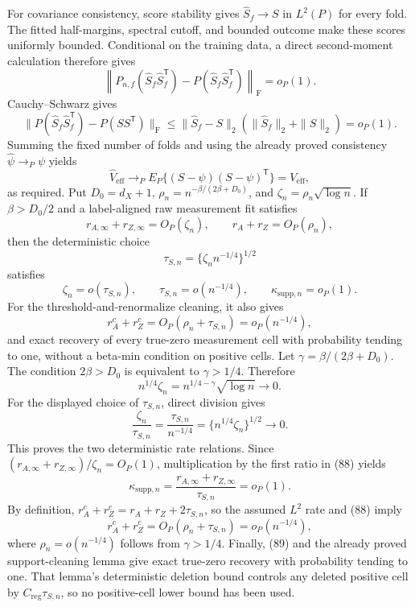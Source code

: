 For covariance consistency, score stability gives \(\widehat S_f\to S\) in \(L^2(P)\) for every fold.  The fitted half-margins, spectral cutoff, and bounded outcome make these scores uniformly bounded.  Conditional on the training data, a direct second-moment calculation therefore gives
\[
 \left\|P_{n,f}(\widehat S_f\widehat S_f^{\mathsf T})
 -P(\widehat S_f\widehat S_f^{\mathsf T})\right\|_{\mathrm F}=o_P(1). \tag{85}
\]
Cauchy--Schwarz gives
\[
 \|P(\widehat S_f\widehat S_f^{\mathsf T})-P(SS^{\mathsf T})\|_{\mathrm F}
 \leq\|\widehat S_f-S\|_2(\|\widehat S_f\|_2+\|S\|_2)=o_P(1). \tag{86}
\]
Summing the fixed number of folds and using the already proved consistency \(\widehat\psi\to_P\psi\) yields
\[
 \widehat V_{\mathrm{eff}}
 \to_P E_P\{(S-\psi)(S-\psi)^{\mathsf T}\}=V_{\mathrm{eff}},
\]
as required.
Put \(D_0=d_X+1\), \(\rho_n=n^{-\beta/(2\beta+D_0)}\), and \(\zeta_n=\rho_n\sqrt{\log n}\).  If \(\beta>D_0/2\) and a label-aligned raw measurement fit satisfies
\[
 r_{A,\infty}+r_{Z,\infty}=O_P(\zeta_n),
 \qquad r_A+r_Z=O_P(\rho_n),
\]
then the deterministic choice
\[
 \tau_{S,n}=\{\zeta_n n^{-1/4}\}^{1/2}
\]
satisfies
\[
 \zeta_n=o(\tau_{S,n}),
 \qquad \tau_{S,n}=o(n^{-1/4}),
 \qquad \kappa_{\mathrm{supp},n}=o_P(1).
\]
For the threshold-and-renormalize cleaning, it also gives
\[
 r_A^c+r_Z^c=O_P(\rho_n+\tau_{S,n})=o_P(n^{-1/4}),
\]
and exact recovery of every true-zero measurement cell with probability tending to one, without a beta-min condition on positive cells.
Let \(\gamma=\beta/(2\beta+D_0)\).  The condition \(2\beta>D_0\) is equivalent to \(\gamma>1/4\).  Therefore
\[
 n^{1/4}\zeta_n=n^{1/4-\gamma}\sqrt{\log n}\longrightarrow0.  \tag{87}
\]
For the displayed choice of \(\tau_{S,n}\), direct division gives
\[
 \frac{\zeta_n}{\tau_{S,n}}
 =\frac{\tau_{S,n}}{n^{-1/4}}
 =\{n^{1/4}\zeta_n\}^{1/2}\longrightarrow0.                   \tag{88}
\]
This proves the two deterministic rate relations.  Since
\((r_{A,\infty}+r_{Z,\infty})/\zeta_n=O_P(1)\), multiplication by the first ratio in (88) yields
\[
 \kappa_{\mathrm{supp},n}
 =\frac{r_{A,\infty}+r_{Z,\infty}}{\tau_{S,n}}=o_P(1).         \tag{89}
\]
By definition, \(r_A^c+r_Z^c=r_A+r_Z+2\tau_{S,n}\), so the assumed \(L^2\) rate and (88) imply
\[
 r_A^c+r_Z^c=O_P(\rho_n+\tau_{S,n})=o_P(n^{-1/4}),              \tag{90}
\]
where \(\rho_n=o(n^{-1/4})\) follows from \(\gamma>1/4\).  Finally, (89) and the already proved support-cleaning lemma give exact true-zero recovery with probability tending to one.  That lemma's deterministic deletion bound controls any deleted positive cell by \(C_{\mathrm{reg}}\tau_{S,n}\), so no positive-cell lower bound has been used.
